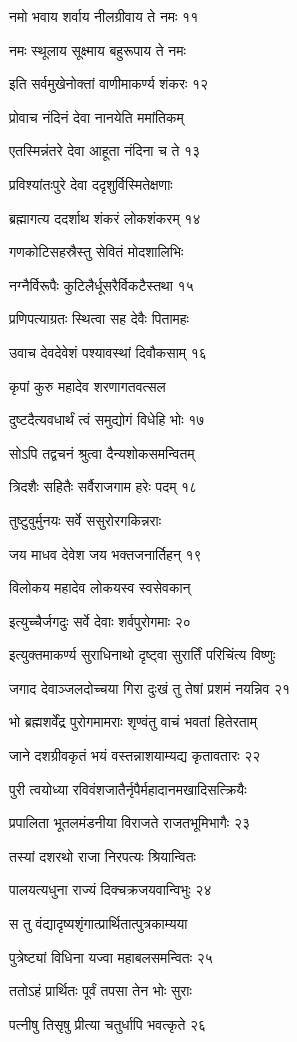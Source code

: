 नमो भवाय शर्वाय नीलग्रीवाय ते नमः ११

नमः स्थूलाय सूक्ष्माय बहुरूपाय ते नमः

इति सर्वमुखेनोक्तां वाणीमाकर्ण्य शंकरः १२

प्रोवाच नंदिनं देवा नानयेति ममांतिकम्

एतस्मिन्नंतरे देवा आहूता नंदिना च ते १३

प्रविश्यांतःपुरे देवा ददृशुर्विस्मितेक्षणाः

ब्रह्मागत्य ददर्शाथ शंकरं लोकशंकरम् १४

गणकोटिसहस्रैस्तु सेवितं मोदशालिभिः

नग्नैर्विरूपैः कुटिलैर्धूसरैर्विकटैस्तथा १५

प्रणिपत्याग्रतः स्थित्वा सह देवैः पितामहः

उवाच देवदेवेशं पश्यावस्थां दिवौकसाम् १६

कृपां कुरु महादेव शरणागतवत्सल

दुष्टदैत्यवधार्थं त्वं समुद्योगं विधेहि भोः १७

सोऽपि तद्वचनं श्रुत्वा दैन्यशोकसमन्वितम्

त्रिदशैः सहितैः सर्वैराजगाम हरेः पदम् १८

तुष्टुवुर्मुनयः सर्वे ससुरोरगकिन्नराः

जय माधव देवेश जय भक्तजनार्तिहन् १९

विलोकय महादेव लोकयस्व स्वसेवकान्

इत्युच्चैर्जगदुः सर्वे देवाः शर्वपुरोगमाः २०

इत्युक्तमाकर्ण्य सुराधिनाथो दृष्ट्वा सुरार्तिं परिचिंत्य विष्णुः

जगाद देवाञ्जलदोच्चया गिरा दुःखं तु तेषां प्रशमं नयन्निव २१

भो ब्रह्मशर्वेंद्र पुरोगमामराः शृण्वंतु वाचं भवतां हितेरताम्

जाने दशग्रीवकृतं भयं वस्तन्नाशयाम्यद्य कृतावतारः २२

पुरी त्वयोध्या रविवंशजातैर्नृपैर्महादानमखादिसत्क्रियैः

प्रपालिता भूतलमंडनीया विराजते राजतभूमिभागैः २३

तस्यां दशरथो राजा निरपत्यः श्रियान्वितः

पालयत्यधुना राज्यं दिक्चक्रजयवान्विभुः २४

स तु वंद्यादृष्यशृंगात्प्रार्थितात्पुत्रकाम्यया

पुत्रेष्ट्यां विधिना यज्वा महाबलसमन्वितः २५

ततोऽहं प्रार्थितः पूर्वं तपसा तेन भोः सुराः

पत्नीषु तिसृषु प्रीत्या चतुर्धापि भवत्कृते २६

